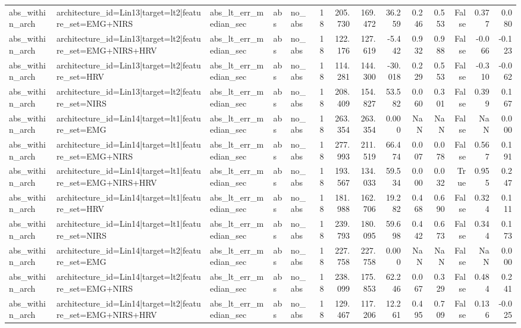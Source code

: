 \begin{table}
\begin{tabular}{lllllrrrrrrrrr}
abs_within_arch & architecture_id=Lin13|target=lt2|feature_set=EMG+NIRS & abs_lt_err_median_sec & abs & no_abs & 18 & 205.730 & 169.472 & 36.259 & 0.246 & 0.553 & False & 0.377 & 0.080 \\
abs_within_arch & architecture_id=Lin13|target=lt2|feature_set=EMG+NIRS+HRV & abs_lt_err_median_sec & abs & no_abs & 18 & 122.176 & 127.619 & -5.442 & 0.932 & 0.988 & False & -0.066 & -0.123 \\
abs_within_arch & architecture_id=Lin13|target=lt2|feature_set=HRV & abs_lt_err_median_sec & abs & no_abs & 18 & 114.281 & 144.300 & -30.018 & 0.229 & 0.553 & False & -0.310 & -0.062 \\
abs_within_arch & architecture_id=Lin13|target=lt2|feature_set=NIRS & abs_lt_err_median_sec & abs & no_abs & 18 & 208.409 & 154.827 & 53.582 & 0.060 & 0.301 & False & 0.399 & 0.167 \\
abs_within_arch & architecture_id=Lin14|target=lt1|feature_set=EMG & abs_lt_err_median_sec & abs & no_abs & 18 & 263.354 & 263.354 & 0.000 & NaN & NaN & False & NaN & 0.000 \\
abs_within_arch & architecture_id=Lin14|target=lt1|feature_set=EMG+NIRS & abs_lt_err_median_sec & abs & no_abs & 18 & 277.993 & 211.519 & 66.474 & 0.007 & 0.078 & False & 0.567 & 0.191 \\
abs_within_arch & architecture_id=Lin14|target=lt1|feature_set=EMG+NIRS+HRV & abs_lt_err_median_sec & abs & no_abs & 18 & 193.567 & 134.033 & 59.534 & 0.000 & 0.032 & True & 0.955 & 0.247 \\
abs_within_arch & architecture_id=Lin14|target=lt1|feature_set=HRV & abs_lt_err_median_sec & abs & no_abs & 18 & 181.988 & 162.706 & 19.282 & 0.468 & 0.690 & False & 0.324 & 0.111 \\
abs_within_arch & architecture_id=Lin14|target=lt1|feature_set=NIRS & abs_lt_err_median_sec & abs & no_abs & 18 & 239.793 & 180.095 & 59.698 & 0.442 & 0.673 & False & 0.344 & 0.173 \\
abs_within_arch & architecture_id=Lin14|target=lt2|feature_set=EMG & abs_lt_err_median_sec & abs & no_abs & 18 & 227.758 & 227.758 & 0.000 & NaN & NaN & False & NaN & 0.000 \\
abs_within_arch & architecture_id=Lin14|target=lt2|feature_set=EMG+NIRS & abs_lt_err_median_sec & abs & no_abs & 18 & 238.099 & 175.853 & 62.246 & 0.067 & 0.329 & False & 0.484 & 0.241 \\
abs_within_arch & architecture_id=Lin14|target=lt2|feature_set=EMG+NIRS+HRV & abs_lt_err_median_sec & abs & no_abs & 18 & 129.467 & 117.206 & 12.261 & 0.495 & 0.709 & False & 0.136 & -0.025 \\

\end{tabular}
\end{table}
